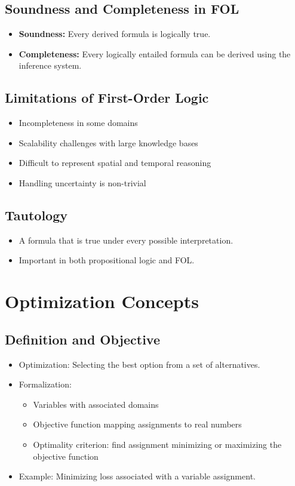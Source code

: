 \subsection{Soundness and Completeness in FOL}
\begin{itemize}
    \item \textbf{Soundness:} Every derived formula is logically true.
    \item \textbf{Completeness:} Every logically entailed formula can be derived using the inference system.
\end{itemize}

\subsection{Limitations of First-Order Logic}
\begin{itemize}
    \item Incompleteness in some domains
    \item Scalability challenges with large knowledge bases
    \item Difficult to represent spatial and temporal reasoning
    \item Handling uncertainty is non-trivial
\end{itemize}

\subsection{Tautology}
\begin{itemize}
    \item A formula that is true under every possible interpretation.
    \item Important in both propositional logic and FOL.
\end{itemize}

\section{Optimization Concepts}

\subsection{Definition and Objective}
\begin{itemize}
    \item Optimization: Selecting the best option from a set of alternatives.
    \item Formalization:
    \begin{itemize}
        \item Variables with associated domains
        \item Objective function mapping assignments to real numbers
        \item Optimality criterion: find assignment minimizing or maximizing the objective function
    \end{itemize}
    \item Example: Minimizing loss associated with a variable assignment.
\end{itemize}

